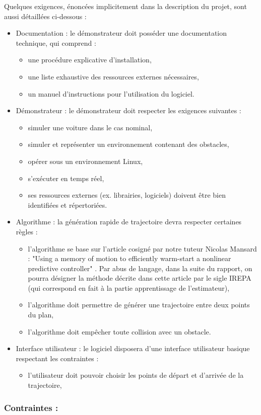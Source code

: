 \documentclass[a4paper,12pt]{report}
\newcommand{\bi}{\begin{itemize}}
\newcommand{\ei}{\end{itemize}}
\newcommand{\itemo}{\item[\textsf{o}]}
\begin{document}
Quelques exigences, énoncées implicitement dans la description du projet, sont aussi détaillées ci-dessous :
\begin{itemize}

\itemo Documentation : le démonstrateur doit posséder une documentation technique, qui comprend :
	\bi
	\item une procédure explicative d'installation,
	\item une liste exhaustive des ressources externes nécessaires,
	\item un manuel d'instructions pour l'utilisation du logiciel.
	\ei
	
\itemo Démonstrateur : le démonstrateur doit respecter les exigences suivantes :
	\bi
	\item simuler une voiture dans le cas nominal,
	\item simuler et représenter un environnement contenant des obstacles,
	\item opérer sous un environnement Linux,
	\item s'exécuter en temps réel,
	\item ses ressources externes (ex. librairies, logiciels) doivent être bien identifiées et répertoriées.
	\ei
	
\itemo Algorithme : la génération rapide de trajectoire devra respecter certaines règles :
	\bi
	\item l'algorithme se base sur l'article cosigné par notre tuteur Nicolas Mansard :  "Using a memory of motion to efficiently warm-start a nonlinear predictive controller" \cite{mansard}. Par abus de langage, dans la suite du rapport, on pourra désigner la méthode décrite dans cette article par le sigle IREPA (qui correspond en fait à la partie apprentissage de l'estimateur),
	\item l'algorithme doit permettre de générer une trajectoire entre deux points du plan,
	\item l'algorithme doit empêcher toute collision avec un obstacle.
	\ei

\itemo Interface utilisateur : le logiciel disposera d'une interface utilisateur basique respectant les contraintes :
	\bi
	\item l'utilisateur doit pouvoir choisir les points de départ et d'arrivée de la trajectoire,
	\ei
	
\end{itemize}


\bigskip

\subsubsection{Contraintes :}
\end{document}
